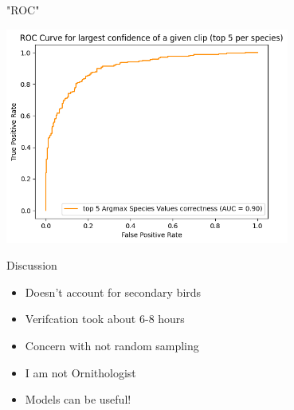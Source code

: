 \begin{frame}{"ROC"}

    \centering
    \includegraphics[height=0.7\textheight,width=0.7\textwidth,keepaspectratio]{./images/roc.png}

\end{frame}

\begin{frame}{Discussion}
    \begin{itemize}
        \item Doesn't account for secondary birds
        \item Verifcation took about 6-8 hours
        \item Concern with not random sampling
        \item I am not Ornithologist
        \item Models can be useful!
    \end{itemize}
\end{frame}